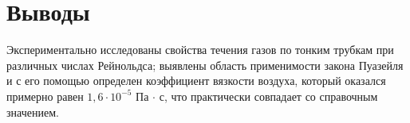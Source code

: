 \section{Выводы}

Экспериментально исследованы свойства течения газов
по тонким трубкам при различных числах Рейнольдса; выявлены область
применимости закона Пуазейля и с его помощью определен коэффициент
вязкости воздуха, который оказался примерно равен $1,6 \cdot 10^{-5}$ Па $\cdot$ с, что практически совпадает со справочным значением.
